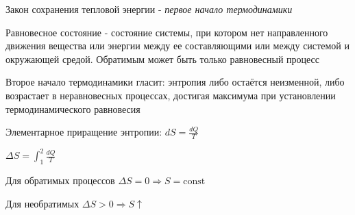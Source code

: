 \documentclass[12pt]{article}
\begin{document}
    Закон сохранения тепловой энергии - \textit{первое начало термодинамики}

    Равновесное состояние - состояние системы, при котором нет направленного движения вещества или энергии 
    между ее составляющими или между системой и окружающей средой. 
    Обратимым может быть только равновесный процесс

    Второе начало термодинамики гласит: энтропия либо остаётся неизменной, либо возрастает в неравновесных процессах, 
    достигая максимума при установлении термодинамического равновесия

    Элементарное приращение энтропии: $dS = \frac{dQ}{T}$

    $\Delta S = \int_1^2 \frac{dQ}{T}$

    Для обратимых процессов $\Delta S = 0 \Longrightarrow S = \mathrm{const}$

    Для необратимых $\Delta S > 0 \Longrightarrow S \uparrow$

    
\end{document}
